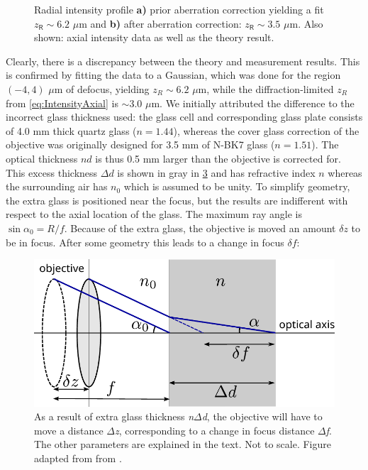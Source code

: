 \begin{figure}
\begin{subfigure}{.49\textwidth}
		\caption{}
		\label{fig:AxialZernike}
	\end{subfigure}
	\caption{Radial intensity profile \textbf{a)} prior aberration correction yielding a fit $\mathsf{\textit{z}_R \sim 6.2}$ $\mathsf{\mu}$m and \textbf{b)} after aberration correction: $\mathsf{\textit{z}_R \sim 3.5}$ $\mathsf{\mu}$m. Also shown: axial intensity data as well as the theory result.}
	\label{fig:AxialScans}
\end{figure}
Clearly, there is a discrepancy between the theory and measurement results.
This is confirmed by fitting the data to a Gaussian, which was done for the region $(-4, 4)$ $\mu$m of defocus, yielding $z_R \sim 6.2$ $\mu$m, while the diffraction-limited $z_R$ from \cref{eq:IntensityAxial} is $\sim 3.0$ $\mu$m.
We initially attributed the difference to the incorrect glass thickness used: the glass cell and corresponding glass plate consists of 4.0 mm thick quartz glass ($n=1.44$), whereas the cover glass correction of the objective was originally designed for 3.5 mm of N-BK7 glass ($n=1.51$).
The optical thickness $nd$ is thus 0.5 mm larger than the objective is corrected for. 
This excess thickness $\Delta d$ is shown in gray in \cref{fig:SphericalSketch} and has refractive index $n$ whereas the surrounding air has $n_0$ which is assumed to be unity.
To simplify geometry, the extra glass is positioned near the focus, but the results are indifferent with respect to the axial location of the glass.
The maximum ray angle is $\sin{\alpha_0} = R/f$. 
Because of the extra glass, the objective is moved an amount $\delta z$ to be in focus.
After some geometry \cite{Iwaniuk2011} this leads to a change in focus $\delta f$:

\begin{figure}[b]
    \centering
    \includegraphics[width=0.57\linewidth]{figures/sphericalAberration.pdf}
    \caption{As a result of extra glass thickness \textit{n$\Delta$d}, the objective will have to move a distance \textit{$\Delta$z}, corresponding to a change in focus distance \textit{$\Delta$f}.
    The other parameters are explained in the text.
    Not to scale.
    Figure adapted from from \cite{Iwaniuk2011}.}
    \label{fig:SphericalSketch}
\end{figure}


